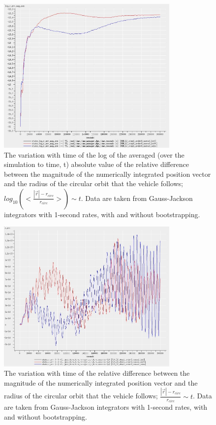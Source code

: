 \begin{description}
\begin{figure}[!ht]
\centering
\includegraphics[width=3.5in]{figures/GJ_bootstrap_short_log.jpg}
\caption[Variation with Time of Orbital Position Error]
{The variation with time of the log of the averaged (over the 
simulation to time, t) absolute value of the relative difference between the 
magnitude of the numerically integrated position vector and the radius of the 
circular orbit that the vehicle follows; $log_{10} (<\frac{|\vec{r}| - 
r_{circ}}{r_{circ}}>) \sim t$.  Data are taken from Gauss-Jackson 
integrators with 1-second rates, with and without bootstrapping.}
\label{fig:GJ_bootstrap_short_log}
\end{figure}


\begin{figure}[!ht]
\centering
\includegraphics[width=3.5in]{figures/GJ_bootstrap_short_val.jpg}
\caption[Variation with Time of Orbital Position Error]
{The variation with 
time of the 
relative difference between the 
magnitude of the numerically integrated position vector and the radius of the 
circular orbit that the vehicle follows; $\frac{|\vec{r}| - 
r_{circ}}{r_{circ}} \sim t$.  Data are taken from Gauss-Jackson integrators 
with 1-second rates, with and without bootstrapping.}
\label{fig:GJ_bootstrap_short_val}
\end{figure}


\end{description}
